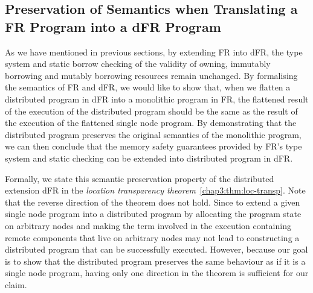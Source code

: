 \subsection{Preservation of Semantics when Translating a FR Program into a dFR Program}
\label{chap3:semantics:loc-transp}
As we have mentioned in previous sections, by extending FR into dFR, the type system and static borrow checking of the validity of owning, immutably borrowing and mutably borrowing resources remain unchanged. By formalising the semantics of FR and dFR, we would like to show that, when we flatten a distributed program in dFR into a monolithic program in FR, the flattened result of the execution of the distributed program should be the same as the result of the execution of the flattened single node program. By demonstrating that the distributed program preserves the original semantics of the monolithic program, we can then conclude that the memory safety guarantees provided by FR's type system and static checking can be extended into distributed program in dFR.

Formally, we state this semantic preservation property of the distributed extension dFR in the \emph{location transparency theorem}~\ref{chap3:thm:loc-transp}. Note that the reverse direction of the theorem does not hold. Since to extend a given single node program into a distributed program by allocating the program state on arbitrary nodes and making the term involved in the execution containing remote components that live on arbitrary nodes may not lead to constructing a distributed program that can be successfully executed. However, because our goal is to show that the distributed program preserves the same behaviour as if it is a single node program, having only one direction in the theorem is sufficient for our claim.

